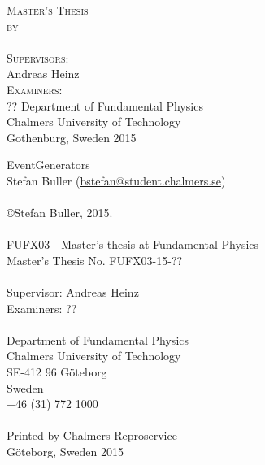 \thispagestyle{empty}
\begin{titlepage}

\begin{center}
\vspace*{0.5cm}
\huge{\textbf{\thetitle }}
\vspace*{1.5cm}

\Large{\textsc{Master's Thesis}}\\
\vspace*{1cm}
\large{\textsc {by}}\\
\vspace*{0.4cm}
\LARGE{\theauthor}\\
\vspace*{1.2cm}
\Large{\textsc{Supervisors:}}\\
\vspace*{0.4cm}
\LARGE{Andreas Heinz}\\
\vspace*{1.0cm}
\Large{\textsc{Examiners:}}\\
\vspace*{0.4cm}
\LARGE{??}
\vfill
\large{Department of Fundamental Physics \\
	Chalmers University of Technology \\
	Gothenburg, Sweden 2015}
\end{center}

\end{titlepage}
\clearpage
\noindent EventGenerators\\
\noindent Stefan Buller (\href{mailto:bstefan@student.chalmers.se}{bstefan@student.chalmers.se})\\\\
\copyright Stefan Buller, 2015.\\\\
FUFX03  - Master's thesis at Fundamental Physics\\
Master's Thesis No. FUFX03-15-??\\\\
Supervisor: Andreas Heinz\\
Examiners: ??\\\\
Department of Fundamental Physics\\
Chalmers University of Technology\\
SE-412 96 Göteborg\\
Sweden\\
+46 (31) 772 1000\\\\
Printed by Chalmers Reproservice\\
Göteborg, Sweden 2015
 
